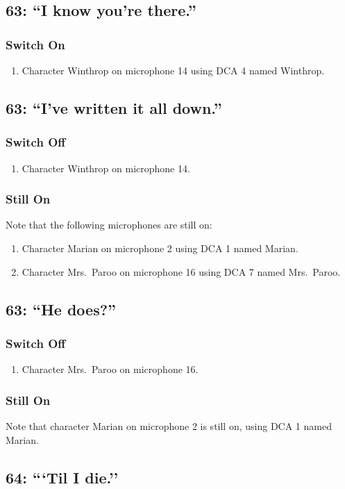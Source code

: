 \subsection* {63: ``I know you're there.''}
\subsubsection* {Switch On}
\begin{enumerate}
\item Character Winthrop on microphone 14 using DCA 4 named Winthrop.
\end{enumerate}
\subsection* {63: ``I've written it all down.''}
\subsubsection* {Switch Off}
\begin{enumerate}
\item Character Winthrop on microphone 14.
\end{enumerate}
\subsubsection* {Still On}
Note that the following microphones are still on:
\begin{enumerate}
\item Character Marian on microphone 2 using DCA 1 named Marian.
\item Character Mrs.~Paroo on microphone 16 using DCA 7 named Mrs.~Paroo.
\end{enumerate}
\subsection* {63: ``He does?''}
\subsubsection* {Switch Off}
\begin{enumerate}
\item Character Mrs.~Paroo on microphone 16.
\end{enumerate}
\subsubsection* {Still On}
Note that character Marian on microphone 2 is still on, using DCA 1 named Marian.\subsection* {64: ```Til I die.''}
